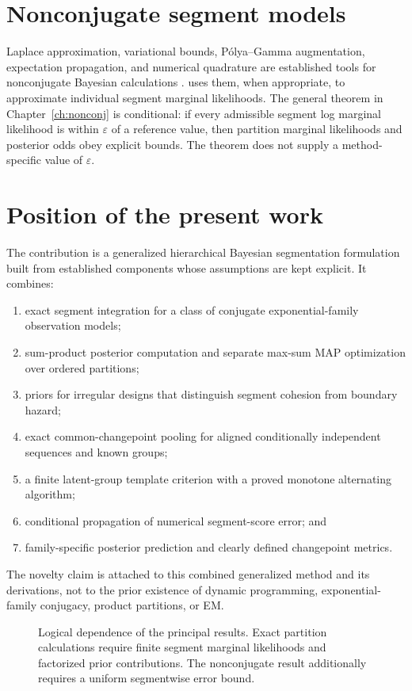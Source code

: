 \section{Nonconjugate segment models}
Laplace approximation, variational bounds, P\'olya--Gamma augmentation, expectation propagation,
and numerical quadrature are established tools for nonconjugate Bayesian calculations
\citep{tierney1986laplace,jaakkola2000logisticvb,polson2013pg,minka2001ep}. \BayesBreak uses them, when
appropriate, to approximate individual segment marginal likelihoods. The general theorem in
Chapter~\ref{ch:nonconj} is conditional: if every admissible segment log marginal likelihood is
within $\varepsilon$ of a reference value, then partition marginal likelihoods and posterior odds
obey explicit bounds. The theorem does not supply a method-specific value of $\varepsilon$.

\section{Position of the present work}
The contribution is a generalized hierarchical Bayesian segmentation formulation built from
established components whose assumptions are kept explicit. It combines:
\begin{enumerate}
\item exact segment integration for a class of conjugate exponential-family observation models;
\item sum-product posterior computation and separate max-sum MAP optimization over ordered
partitions;
\item priors for irregular designs that distinguish segment cohesion from boundary hazard;
\item exact common-changepoint pooling for aligned conditionally independent sequences and known
groups;
\item a finite latent-group template criterion with a proved monotone alternating algorithm;
\item conditional propagation of numerical segment-score error; and
\item family-specific posterior prediction and clearly defined changepoint metrics.
\end{enumerate}
The novelty claim is attached to this combined generalized method and its derivations, not to the
prior existence of dynamic programming, exponential-family conjugacy, product partitions, or EM.

\begin{figure}[H]
\centering
\resizebox{0.96\textwidth}{!}{}
\caption{Logical dependence of the principal results. Exact partition calculations require finite
segment marginal likelihoods and factorized prior contributions. The nonconjugate result additionally
requires a uniform segmentwise error bound.}
\label{fig:theorem-dependency}
\end{figure}

